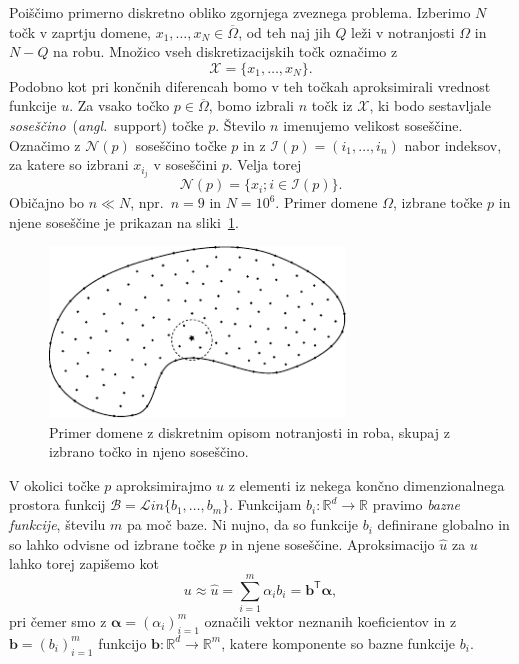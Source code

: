 \documentclass[12pt,a4paper,twoside]{article}
\theoremstyle{definition} %
\theoremstyle{plain} %
\numberwithin{equation}{section}
\newcommand{\R}{\mathbb R}
\newcommand{\Nc}{\mathcal{N}}
\newcommand{\I}{\mathcal{I}}
\newcommand{\B}{\mathcal{B}}
\newcommand{\T}{\mathsf{T}}
\newcommand{\X}{\mathcal{X}}
\renewcommand{\b}{\boldsymbol}
\newcommand{\zomega}{\overline{\Omega}}
\newcommand{\Lin}{\mathcal{L}in}
\newcommand{\uh}{\hat{u}}
\newcommand{\ang}[1]{(\hspace{-1.5px}\textit{angl.}\ #1)}
\begin{document}
Poiščimo primerno diskretno obliko zgornjega zveznega problema. Izberimo $N$ točk v zaprtju domene,
$x_1, \dots, x_N \in \zomega$, od teh naj jih $Q$ leži v notranjosti $\Omega$ in $N-Q$ na robu.
Množico vseh diskretizacijskih točk označimo z
\begin{equation}
  \X  = \{x_1, \dots, x_N\}.
\end{equation}
Podobno kot pri končnih diferencah bomo v teh točkah aproksimirali vrednost funkcije $u$. Za vsako
točko $p \in \zomega$, bomo izbrali $n$ točk iz $\X$, ki bodo sestavljale
\emph{soseščino}~\ang{support} točke $p$. Število $n$ imenujemo velikost soseščine. Označimo z
$\Nc(p)$ soseščino točke $p$ in z $\I(p) = (i_1, \dots, i_n)$ nabor indeksov, za katere so
izbrani $x_{i_j}$ v soseščini $p$. Velja torej
\begin{equation}
  \Nc(p) = \{x_i; i \in \I(p)\}.
\end{equation}
Običajno bo $n \ll N$, npr.~$n = 9$ in $N = 10^6$.
Primer domene $\Omega$, izbrane točke $p$ in njene soseščine je prikazan na
sliki~\ref{fig:domain-example}.

\begin{figure}[ht]
  \centering
  \includegraphics[width=0.7\textwidth]{images/domain_theoretical.pdf}
  \caption[Domena in diskretizacija notranjosti in roba.]{Primer domene z
  diskretnim opisom notranjosti in roba, skupaj z izbrano točko in njeno
soseščino.}
  \label{fig:domain-example}
\end{figure}

V okolici točke $p$ aproksimirajmo $u$ z elementi iz nekega končno
dimenzionalnega prostora funkcij $\B = \Lin\{b_1, \dots, b_m\}$.
Funkcijam $b_i\colon \R^d \to \R$ pravimo \emph{bazne funkcije},
številu $m$ pa moč baze. Ni nujno, da so funkcije $b_i$ definirane
globalno in so lahko odvisne od izbrane točke $p$ in njene soseščine.
Aproksimacijo $\uh$ za $u$ lahko torej zapišemo kot
\begin{equation}
  \label{eq:uhat-def}
   u \approx \uh = \sum_{i=1}^m \alpha_i b_i = \b{b}^\T \b{\alpha},
\end{equation}
pri čemer smo z $\b{\alpha} = (\alpha_i)_{i=1}^m$ označili vektor neznanih
koeficientov in z $\b{b} = (b_i)_{i=1}^m$ funkcijo $\b{b}\colon\R^d\to\R^m$, katere
komponente so bazne funkcije $b_i$.
\end{document}
